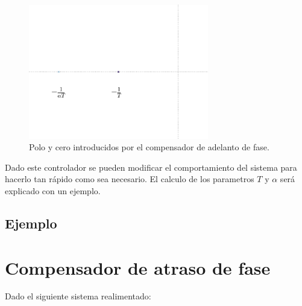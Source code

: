         \begin{figure}
            \centering
            \includegraphics[width=0.7\textwidth]{./imagenes/adelantopoloycero.pdf}
            \caption{\label{fig:adelantopoloycero}Polo y cero introducidos por el compensador de adelanto de fase.}
        \end{figure}

        Dado este controlador se pueden modificar el comportamiento del sistema para hacerlo tan rápido como sea necesario. El calculo de los parametros $T$ y $\alpha$ será explicado con un ejemplo.

        \subsection{Ejemplo}

    \newpage
    \section{Compensador de atraso de fase}

        Dado el siguiente sistema realimentado:

